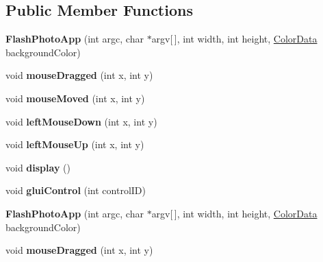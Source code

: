 \subsection*{Public Member Functions}
\begin{DoxyCompactItemize}
\item 
\hypertarget{classFlashPhotoApp_a944931218613603cfb6bda6113971382}{{\bfseries Flash\-Photo\-App} (int argc, char $\ast$argv\mbox{[}$\,$\mbox{]}, int width, int height, \hyperlink{classColorData}{Color\-Data} background\-Color)}\label{classFlashPhotoApp_a944931218613603cfb6bda6113971382}

\item 
\hypertarget{classFlashPhotoApp_a29505b498fac898e099cfd1b8590c91a}{void {\bfseries mouse\-Dragged} (int x, int y)}\label{classFlashPhotoApp_a29505b498fac898e099cfd1b8590c91a}

\item 
\hypertarget{classFlashPhotoApp_acf5a4cc5b76bb676d337758543bfdcc4}{void {\bfseries mouse\-Moved} (int x, int y)}\label{classFlashPhotoApp_acf5a4cc5b76bb676d337758543bfdcc4}

\item 
\hypertarget{classFlashPhotoApp_a2c348ddcc15b6a21972bc6aac98c5442}{void {\bfseries left\-Mouse\-Down} (int x, int y)}\label{classFlashPhotoApp_a2c348ddcc15b6a21972bc6aac98c5442}

\item 
\hypertarget{classFlashPhotoApp_ae3a2f37b7c3657dcb5c16402c6d25519}{void {\bfseries left\-Mouse\-Up} (int x, int y)}\label{classFlashPhotoApp_ae3a2f37b7c3657dcb5c16402c6d25519}

\item 
\hypertarget{classFlashPhotoApp_a5dedc84bbc9ea0cf0718b8d0d0f414a5}{void {\bfseries display} ()}\label{classFlashPhotoApp_a5dedc84bbc9ea0cf0718b8d0d0f414a5}

\item 
\hypertarget{classFlashPhotoApp_aaeea3b8490d0f0239e41b781f6a066aa}{void {\bfseries glui\-Control} (int control\-I\-D)}\label{classFlashPhotoApp_aaeea3b8490d0f0239e41b781f6a066aa}

\item 
\hypertarget{classFlashPhotoApp_a944931218613603cfb6bda6113971382}{{\bfseries Flash\-Photo\-App} (int argc, char $\ast$argv\mbox{[}$\,$\mbox{]}, int width, int height, \hyperlink{classColorData}{Color\-Data} background\-Color)}\label{classFlashPhotoApp_a944931218613603cfb6bda6113971382}

\item 
\hypertarget{classFlashPhotoApp_a29505b498fac898e099cfd1b8590c91a}{void {\bfseries mouse\-Dragged} (int x, int y)}\label{classFlashPhotoApp_a29505b498fac898e099cfd1b8590c91a}


\end{DoxyCompactItemize}

